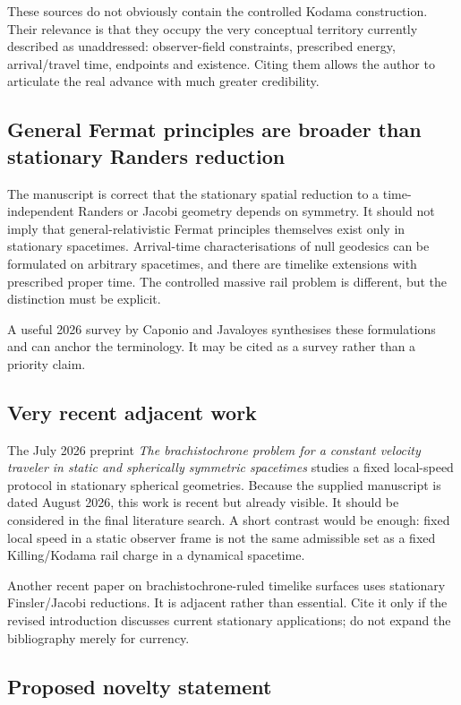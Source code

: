 \documentclass[11pt,a4paper]{article}
\begin{document}
These sources do not obviously contain the controlled Kodama construction.  Their relevance is
that they occupy the very conceptual territory currently described as unaddressed: observer-field
constraints, prescribed energy, arrival/travel time, endpoints and existence.  Citing them allows
the author to articulate the real advance with much greater credibility.

\subsection{General Fermat principles are broader than stationary Randers reduction}

The manuscript is correct that the stationary spatial reduction to a time-independent Randers or
Jacobi geometry depends on symmetry.  It should not imply that general-relativistic Fermat
principles themselves exist only in stationary spacetimes.  Arrival-time characterisations of
null geodesics can be formulated on arbitrary spacetimes, and there are timelike extensions with
prescribed proper time.  The controlled massive rail problem is different, but the distinction
must be explicit.

A useful 2026 survey by Caponio and Javaloyes synthesises these formulations and can anchor the
terminology.  It may be cited as a survey rather than a priority claim.

\subsection{Very recent adjacent work}

The July 2026 preprint \emph{The brachistochrone problem for a constant velocity traveler in static
and spherically symmetric spacetimes} studies a fixed local-speed protocol in stationary spherical
geometries.  Because the supplied manuscript is dated August 2026, this work is recent but already
visible.  It should be considered in the final literature search.  A short contrast would be
enough: fixed local speed in a static observer frame is not the same admissible set as a fixed
Killing/Kodama rail charge in a dynamical spacetime.

Another recent paper on brachistochrone-ruled timelike surfaces uses stationary Finsler/Jacobi
reductions.  It is adjacent rather than essential.  Cite it only if the revised introduction
discusses current stationary applications; do not expand the bibliography merely for currency.

\subsection{Proposed novelty statement}
\end{document}
